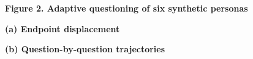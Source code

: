 \documentclass[10pt]{article}
\begin{document}
\vspace*{2mm}
\begin{center}\Large\bfseries Figure 2. Adaptive questioning of six synthetic personas\end{center}
\vspace{4mm}
\noindent
\begin{minipage}[t]{.487\textwidth}
\centering\vspace{0pt}
{\footnotesize\bfseries (a) Endpoint displacement}\par\vspace{1mm}

\end{minipage}\hfill
\begin{minipage}[t]{.487\textwidth}
\centering\vspace{0pt}
{\footnotesize\bfseries (b) Question-by-question trajectories}\par\vspace{1mm}

\end{minipage}
\end{document}
